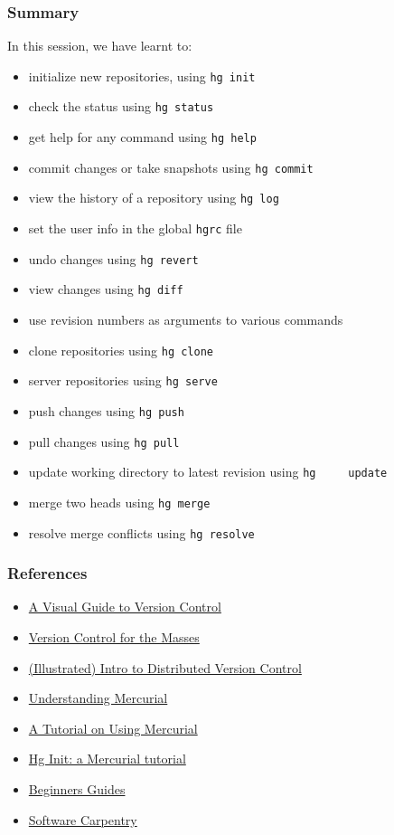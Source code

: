 \documentclass[14pt,compress]{beamer}
\newcommand{\typ}[1]{\lstinline{#1}}
\begin{document}
\begin{frame}
  \frametitle{Summary}
  In this session, we have learnt to:
  \begin{itemize}
  \item initialize new repositories, using \typ{hg init}
  \item check the status using \typ{hg status}
  \item get help for any command using \typ{hg help}
  \item commit changes or take snapshots using \typ{hg commit}
  \item view the history of a repository using \typ{hg log}
  \item set the user info in the global \typ{hgrc} file
  \item undo changes using \typ{hg revert}
  \item view changes using \typ{hg diff}
  \item use revision numbers as arguments to various commands
  \item clone repositories using \typ{hg clone}
  \item server repositories using \typ{hg serve}
  \item push changes using \typ{hg push}
  \item pull changes using \typ{hg pull}
  \item update working directory to latest revision using \typ{hg
    update}
  \item merge two heads using \typ{hg merge}
  \item resolve merge conflicts using \typ{hg resolve}
  \end{itemize}
\end{frame}


\begin{frame}
  \frametitle{References}
  \begin{itemize}
  \item \href{http://betterexplained.com/articles/a-visual-guide-to-version-control/}{A Visual Guide to Version Control}
  \item \href{http://karlagius.com/2009/01/09/version-control-for-the-masses/}{Version Control for the Masses}
  \item \href{http://betterexplained.com/articles/intro-to-distributed-version-control-illustrated/}{(Illustrated) Intro to Distributed Version Control}
  \item \href{http://mercurial.selenic.com/wiki/UnderstandingMercurial}{Understanding Mercurial}
  \item \href{http://mercurial.selenic.com/wiki/Tutorial}{A Tutorial on Using Mercurial}
  \item \href{http://hginit.com/}{Hg Init: a Mercurial tutorial}
  \item \href{http://mercurial.selenic.com/wiki/BeginnersGuides}{Beginners Guides}
  \item \href{http://software-carpentry.org/4_0/vc/}{Software Carpentry}
  \end{itemize}
\end{frame}
\end{document}
